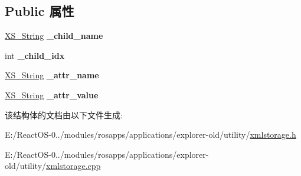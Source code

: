 \subsection*{Public 属性}
\begin{DoxyCompactItemize}
\item 
\mbox{\label{struct_x_m_l_storage_1_1_x_path_element_ab230ec417d2b408372f480e5904a8ad9}} 
\hyperlink{struct_x_m_l_storage_1_1_x_s___string}{X\+S\+\_\+\+String} {\bfseries \+\_\+child\+\_\+name}
\item 
\mbox{\label{struct_x_m_l_storage_1_1_x_path_element_a09388c35772f59fa474f294a84b318b7}} 
int {\bfseries \+\_\+child\+\_\+idx}
\item 
\mbox{\label{struct_x_m_l_storage_1_1_x_path_element_a63850fbb801c897ccc4a6704d7f8111d}} 
\hyperlink{struct_x_m_l_storage_1_1_x_s___string}{X\+S\+\_\+\+String} {\bfseries \+\_\+attr\+\_\+name}
\item 
\mbox{\label{struct_x_m_l_storage_1_1_x_path_element_a527dba919a2ee230f94fd3ad16d03a20}} 
\hyperlink{struct_x_m_l_storage_1_1_x_s___string}{X\+S\+\_\+\+String} {\bfseries \+\_\+attr\+\_\+value}
\end{DoxyCompactItemize}


该结构体的文档由以下文件生成\+:\begin{DoxyCompactItemize}
\item 
E\+:/\+React\+O\+S-\/0../modules/rosapps/applications/explorer-\/old/utility/\hyperlink{xmlstorage_8h}{xmlstorage.\+h}\item 
E\+:/\+React\+O\+S-\/0../modules/rosapps/applications/explorer-\/old/utility/\hyperlink{xmlstorage_8cpp}{xmlstorage.\+cpp}\end{DoxyCompactItemize}
